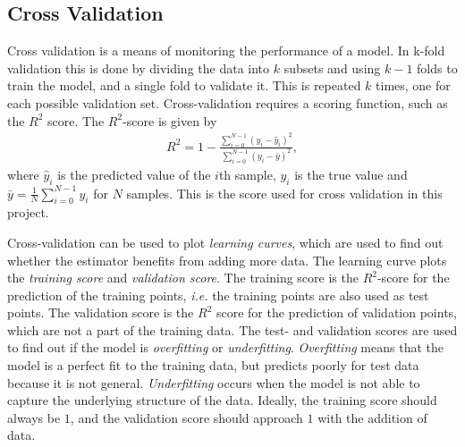 \documentclass[twoside,english]{uiofysmaster}
\begin{document}
\subsection{Cross Validation}\label{Sec:: gaussian process : Cross Validation}


Cross validation is a means of monitoring the performance of a model. In k-fold validation this is done by dividing the data into $k$ subsets and using $k-1$ folds to train the model, and a single fold to validate it. This is repeated $k$ times, one for each possible validation set. Cross-validation requires a scoring function, such as the $R^2$ score. The $R^2$-score is given by 
\begin{align}
R^2 = 1 - \frac{\sum_{i=0}^{N-1} (y_i - \hat{y}_i)^2}{\sum_{i=0}^{N-1} (y_i - \bar{y})^2},
\end{align}
where $\hat{y}_i$ is the predicted value of the $i$th sample, $y_i$ is the true value and $\bar{y} = \frac{1}{N} \sum_{i = 0}^{N-1} y_i$ for $N$ samples. This is the score used for cross validation in this project.

Cross-validation can be used to plot \textit{learning curves}, which are used to find out whether the estimator benefits from adding more data. The learning curve plots the \textit{training score} and \textit{validation score}. The training score is the $R^2$-score for the prediction of the training points, \textit{i.e.} the training points are also used as test points. The validation score is the $R^2$ score for the prediction of validation points, which are not a part of the training data. The test- and validation scores are used to find out if the model is \textit{overfitting} or \textit{underfitting}. \textit{Overfitting} means that the model is a perfect fit to the training data, but predicts poorly for test data because it is not general. \textit{Underfitting} occurs when the model is not able to capture the underlying structure of the data. Ideally, the training score should always be $1$, and the validation score should approach $1$ with the addition of data.
\end{document}
